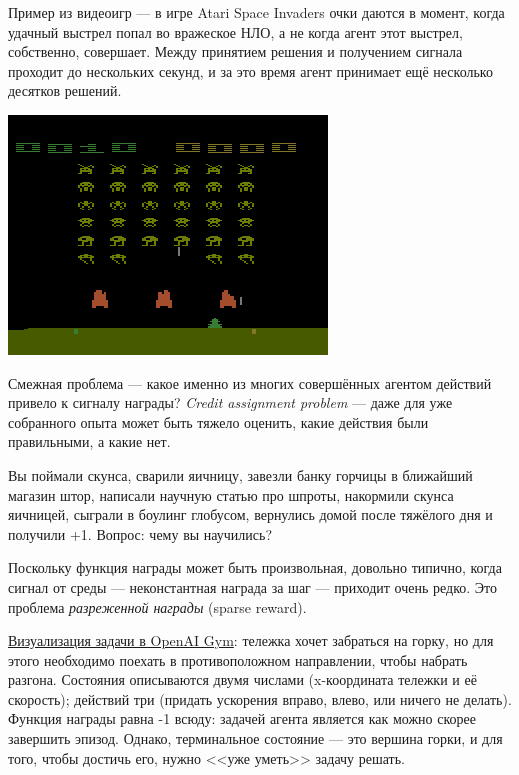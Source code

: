 \begin{exampleBox}[righthand ratio=0.25, sidebyside, sidebyside align=center, lower separated=false]{}
Пример из видеоигр --- в игре Atari Space Invaders очки даются в момент, когда удачный выстрел попал во вражеское НЛО, а не когда агент этот выстрел, собственно, совершает. Между принятием решения и получением сигнала проходит до нескольких секунд, и за это время агент принимает ещё несколько десятков решений.

\tcblower
\includegraphics[width=\textwidth]{Images/SpaceInvaders.png}
\end{exampleBox}

Смежная проблема --- какое именно из многих совершённых агентом действий привело к сигналу награды? \emph{Credit assignment problem} --- даже для уже собранного опыта может быть тяжело оценить, какие действия были правильными, а какие нет. 

\begin{example}
Вы поймали скунса, сварили яичницу, завезли банку горчицы в ближайший магазин штор, написали научную статью про шпроты, накормили скунса яичницей, сыграли в боулинг глобусом, вернулись домой после тяжёлого дня и получили +1. Вопрос: чему вы научились? 
\end{example}

Поскольку функция награды может быть произвольная, довольно типично, когда сигнал от среды --- неконстантная награда за шаг --- приходит очень редко. Это проблема \emph{разреженной награды} (sparse reward).

\begin{example}
\href{https://gym.openai.com/envs/MountainCar-v0/}{Визуализация задачи в OpenAI Gym}: тележка хочет забраться на горку, но для этого необходимо поехать в противоположном направлении, чтобы набрать разгона. Состояния описываются двумя числами (x-координата тележки и её скорость); действий три (придать ускорения вправо, влево, или ничего не делать). Функция награды равна -1 всюду: задачей агента является как можно скорее завершить эпизод. Однако, терминальное состояние --- это вершина горки, и для того, чтобы достичь его, нужно <<уже уметь>> задачу решать.  
\end{example}

